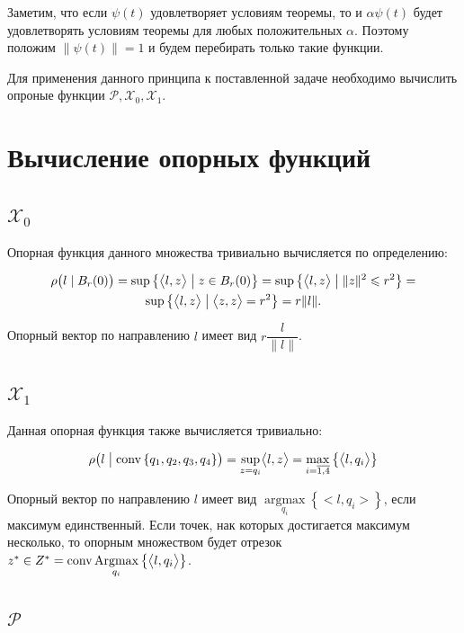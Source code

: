 \documentclass[12pt, a4paper]{article} %
\renewcommand{\le}{\leqslant}
\newcommand{\inner}[2]{\bigl< #1, #2 \bigr>}
\newcommand*{\hm}[1]{#1\nobreak\discretionary{}%
            {\hbox{\mathsurround=0pt #1}}{}}
\DeclareMathOperator{\conv}{conv}
\DeclareMathOperator*{\argmax}{argmax}
\DeclareMathOperator*{\Argmax}{Argmax}
\begin{document}
Заметим, что если $\psi(t)$ удовлетворяет условиям теоремы, то и $\alpha\psi(t)$
будет удовлетворять условиям теоремы для любых положительных  $\alpha$.
Поэтому положим $\| \psi(t) \| = 1$ и будем перебирать только такие функции.

Для применения данного принципа к поставленной задаче необходимо вычислить
опроные функции $\mathcal{P}, \mathcal{X}_0, \mathcal{X}_1$.

\section{Вычисление опорных функций}

\subsection{$\mathcal{X}_0$}

Опорная функция данного множества тривиально вычисляется по определению:

\begin{multline*}
    \rho \bigl( l \mid B_r(0) \bigr) =
    \sup \left\{ \inner{l}{z} \bigm| z \in B_r(0) \right\} =
    \sup \left\{ \inner{l}{z} \bigm| \| z \|^2 \le r^2 \right\} =\\
    \sup \left\{ \inner{l}{z} \bigm| \inner{z}{z} = r^2 \right\} =
    r \| l \|
.\end{multline*}

Опорный вектор по направлению $l$ имеет вид $r \dfrac{l}{\|l\|}$.

\subsection{$\mathcal{X}_1$}

Данная опорная функция также вычисляется тривиально:

\begin{equation*}
    \rho \bigl( l \bigm| \conv\left\{ q_1, q_2, q_3, q_4 \right\} \bigr) =
    \sup\limits_{z = q_i} \inner{l}{z} = 
    \max\limits_{i=\overline{1,4}} \left\{ \inner{l}{q_i} \right\}
\end{equation*} 

Опорный вектор по направлению $l$ имеет вид 
$\argmax\limits_{q_i} \left\{ \inner{l}{q_i} \right\}$,
если максимум единственный.
Если точек, нак которых достигается максимум несколько, то опорным множеством
будет отрезок
$z^{*} \in Z^* \hm= 
\conv \Argmax\limits_{q_i} \left\{ \inner{l}{q_i} \right\}$.

\subsection{$\mathcal{P}$}
\end{document}
